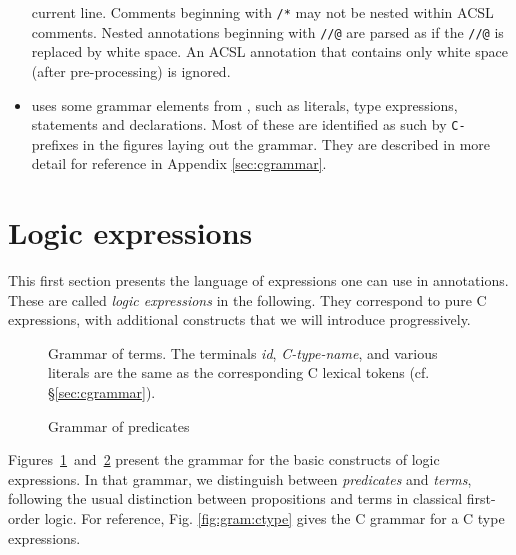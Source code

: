 \begin{itemize}
  current line. Comments beginning with \texttt{/*} may not be nested within ACSL comments. Nested annotations beginning
  with \texttt{//@} are parsed as if the \texttt{//@} is 
  replaced by white space. An ACSL annotation that contains only white space (after
  pre-processing) is ignored.
  \item \NAME uses some grammar elements from \lang, such as literals, type expressions, statements and declarations. Most of these are identified as 
  such by \lstinline|C-| prefixes in the figures laying out the grammar.
  They are described in more detail for reference in Appendix \ref{sec:cgrammar}.
 \end{itemize}


\section{Logic expressions}
\label{sec:expressions}

This first section presents the language of expressions one can use in
annotations. These are called \emph{logic expressions} in the following. They
correspond to pure C expressions, with additional constructs
that we will introduce progressively.

\begin{figure}[t]
  \begin{cadre}
    
  \end{cadre}
  \caption{Grammar of terms. The terminals \emph{id}, \emph{C-type-name}, and various literals are
  	the same as the corresponding C lexical tokens (cf. \S\ref{sec:cgrammar}).}
\label{fig:gram:term}
\end{figure}

\begin{figure}[hb]
  \begin{cadre}
    
  \end{cadre}
  \caption{Grammar of predicates}
\label{fig:gram:pred}
\end{figure}

Figures~\ref{fig:gram:term}~and~\ref{fig:gram:pred} present the
grammar for the basic constructs of logic expressions. In that
grammar, we distinguish between \emph{predicates} and
\emph{terms}, following the usual distinction between
propositions and terms in classical first-order logic.
For reference, Fig. \ref{fig:gram:ctype} gives the C grammar for a C type expressions.
 
